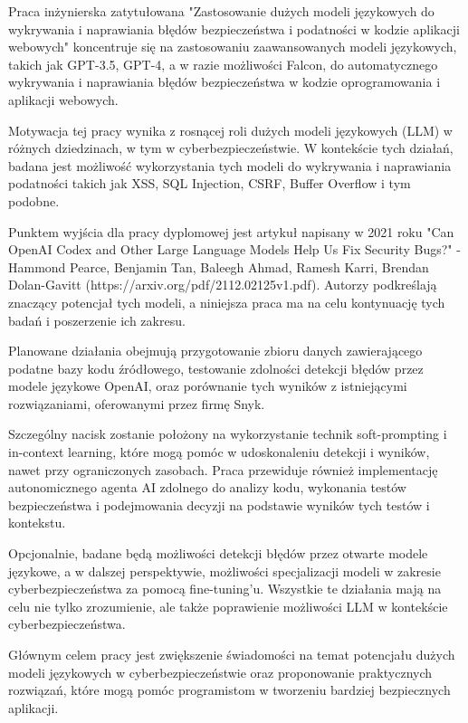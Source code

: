 {Praca inżynierska zatytułowana "Zastosowanie dużych modeli językowych do wykrywania i naprawiania błędów bezpieczeństwa i podatności w kodzie aplikacji webowych" koncentruje się na zastosowaniu zaawansowanych modeli językowych, takich jak GPT-3.5, GPT-4, a w razie możliwości Falcon, do automatycznego wykrywania i naprawiania błędów bezpieczeństwa w kodzie oprogramowania i aplikacji webowych.

Motywacja tej pracy wynika z rosnącej roli dużych modeli językowych (LLM) w różnych dziedzinach, w tym w cyberbezpieczeństwie. W kontekście tych działań, badana jest możliwość wykorzystania tych modeli do wykrywania i naprawiania podatności takich jak XSS, SQL Injection, CSRF, Buffer Overflow i tym podobne.

Punktem wyjścia dla pracy dyplomowej jest artykuł napisany w 2021 roku 
"Can OpenAI Codex and Other Large Language Models Help Us Fix Security Bugs?"
- Hammond Pearce, Benjamin Tan, Baleegh Ahmad, Ramesh Karri, Brendan Dolan-Gavitt (https://arxiv.org/pdf/2112.02125v1.pdf). Autorzy podkreślają znaczący potencjał tych modeli, a niniejsza praca ma na celu kontynuację tych badań i poszerzenie ich zakresu.

Planowane działania obejmują przygotowanie zbioru danych zawierającego podatne bazy kodu źródłowego, testowanie zdolności detekcji błędów przez modele językowe OpenAI, oraz porównanie tych wyników z istniejącymi rozwiązaniami, oferowanymi przez firmę Snyk. 

Szczególny nacisk zostanie położony na wykorzystanie technik soft-prompting i in-context learning, które mogą pomóc w udoskonaleniu detekcji i wyników, nawet przy ograniczonych zasobach. Praca przewiduje również implementację autonomicznego agenta AI zdolnego do analizy kodu, wykonania testów bezpieczeństwa i podejmowania decyzji na podstawie wyników tych testów i kontekstu.

Opcjonalnie, badane będą możliwości detekcji błędów przez otwarte modele językowe, a w dalszej perspektywie, możliwości specjalizacji modeli w zakresie cyberbezpieczeństwa za pomocą fine-tuning'u. Wszystkie te działania mają na celu nie tylko zrozumienie, ale także poprawienie możliwości LLM w kontekście cyberbezpieczeństwa.

Głównym celem pracy jest zwiększenie świadomości na temat potencjału dużych modeli językowych w cyberbezpieczeństwie oraz proponowanie praktycznych rozwiązań, które mogą pomóc programistom w tworzeniu bardziej bezpiecznych aplikacji.

}